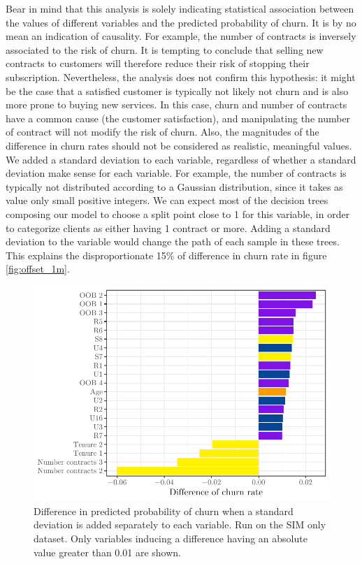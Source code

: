 Bear in mind that this analysis is solely indicating statistical association
between the values of different variables and the predicted probability of
churn. It is by no mean an indication of causality. For example, the number of
contracts is inversely associated to the risk of churn. It is tempting to
conclude that selling new contracts to customers will therefore reduce their
risk of stopping their subscription. Nevertheless, the analysis does not confirm
this hypothesis: it might be the case that a satisfied customer is typically not
likely not churn and is also more prone to buying new services. In this case,
churn and number of contracts have a common cause (the customer satisfaction),
and manipulating the number of contract will not modify the risk of churn. Also,
the magnitudes of the difference in churn rates should not be considered as
realistic, meaningful values. We added a standard deviation to each variable,
regardless of whether a standard deviation make sense for each variable. For
example, the number of contracts is typically not distributed according to a
Gaussian distribution, since it takes as value only small positive integers. We
can expect most of the decision trees composing our model to choose a split
point close to 1 for this variable, in order to categorize clients as either
having 1 contract or more. Adding a standard deviation to the variable would
change the path of each sample in these trees. This explains the
disproportionate 15\% of difference in churn rate in figure \ref{fig:offset_1m}.

\begin{figure}
    \centering
    \includegraphics[width=0.9\linewidth]{figures/offset_1p.pdf}
    \caption{Difference in predicted probability of churn when a standard
    deviation is added separately to each variable. Run on the SIM only dataset.
    Only variables inducing a difference having an absolute value greater than
    0.01 are shown.}
    \label{fig:offset_1p}
\end{figure}

